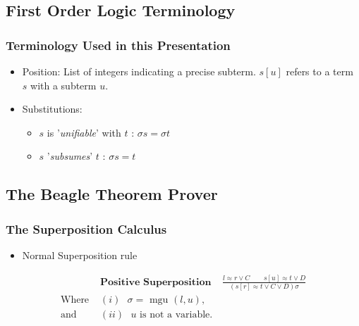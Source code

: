\documentclass[10pt,xcolor={dvipsnames}]{beamer}
\begin{document}
\begin{NoHyper}
\subsection{First Order Logic Terminology}

\begin{frame}
  \frametitle{Terminology Used in this Presentation}
  \begin{itemize}
  \item<1-> Position: List of integers indicating a precise subterm. $s[u]$ refers
  to a term $s$ with a subterm $u$.
  \item<2-> Substitutions:
    \begin{itemize}
    \item<2-> $s$ is '\emph{unifiable}' with $t$ : $\sigma s = \sigma t$
    \item<2-> $s$ '\emph{subsumes}' $t$ : $\sigma s = t$
    \end{itemize}
  \end{itemize}
\end{frame}

\subsection{The Beagle Theorem Prover}

\begin{frame}
  \frametitle{The Superposition Calculus}
  \begin{itemize}
  \item<1-> Normal Superposition rule
  \end{itemize}
  \begin{align*}
&\textbf{Positive Superposition}\ \ \ \ \  \frac{l \approx r \lor C\quad \quad s[u] \approx t \lor D}{(s[r] \approx t \lor C \lor D)\sigma}\\
\text{Where } &(i) \text{ $\sigma = $ mgu $(l,u)$,}\\
\text{and } &(ii) \text{ $u$ is not a variable.}
\end{align*}
\end{frame}


\end{NoHyper}
\end{document}
